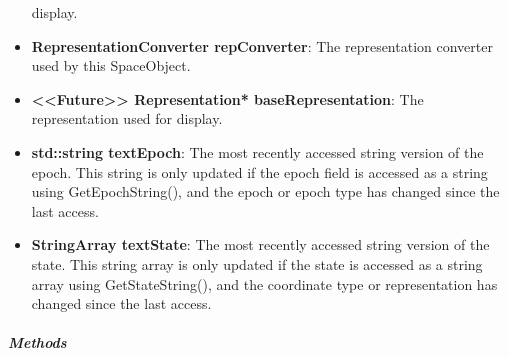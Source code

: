 \begin{itemize}
display.
\item \textbf{RepresentationConverter repConverter}:  The representation converter used by this
SpaceObject.
\item \textbf{<<Future>> Representation* baseRepresentation}:  The representation used for display.
\item \textbf{std::string textEpoch}: The most recently accessed string version of the epoch.  This
string is only updated if the epoch field is accessed as a string using GetEpochString(), and the
epoch or epoch type has changed since the last access.
\item \textbf{StringArray textState}: The most recently accessed string version of the state.  This
string array is only updated if the state is accessed as a string array using GetStateString(), and
the coordinate type or representation has changed since the last access.
\end{itemize}

\subparagraph{\textit{Methods}}

